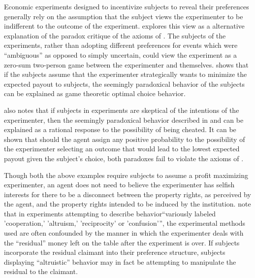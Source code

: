 \documentclass[../main.tex]{subfiles}
\begin{document}
Economic experiments designed to incentivize subjects to reveal their preferences generally rely on the assumption that the subject views the experimenter to be indifferent to the outcome of the experiment.
\textcite{Schneeweiss1973} explores this view as a alternative explanation of the \textcite{Ellsberg1961} paradox critique of the axioms of \textcite{Savage1954}.
The subjects of the \textcite{Ellsberg1961} experiments, rather than adopting different preferences for events which were \enquote{ambiguous} as opposed to simply uncertain, could view the experiment as a zero-sum two-person game between the experimenter and themselves.
\textcite{Schneeweiss1973} shows that if the subjects assume that the experimenter strategically wants to minimize the expected payout to subjects, the seemingly paradoxical behavior of the subjects can be explained as game theoretic optimal choice behavior.

\textcite{Kadane1992} also notes that if subjects in experiments are skeptical of the intentions of the experimenter, then the seemingly paradoxical behavior described in \textcite{Ellsberg1961} and \textcite{Allais1953} can be explained as a rational response to the possibility of being cheated.
It can be shown that should the agent assign any positive probability to the possibility of the experimenter selecting an outcome that would lead to the lowest expected payout given the subject's choice, both paradoxes fail to violate the axioms of \textcite{Savage1954}.

Though both the above examples require subjects to assume a profit maximizing experimenter, an agent does not need to believe the experimenter has selfish interests for there to be a disconnect between the property rights, as perceived by the agent, and the property rights intended to be induced by the institution.
\textcite[178]{Harrison2006} note that in experiments attempting to describe behavior\enquote{variously labeled 'cooperation,' 'altruism,' 'reciprocity' or 'confusion'}, the experimental methods used are often confounded by the manner in which the experimenter deals with the \enquote{residual} money left on the table after the experiment is over.
If subjects incorporate the residual claimant into their preference structure, subjects displaying \enquote{altruistic} behavior may in fact be attempting to manipulate the residual to the claimant.
\end{document}
